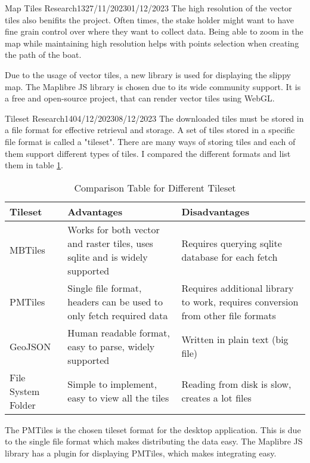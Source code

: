 \documentclass[12pt]{article}
\begin{document}
\begin{logbook-entry}{Map Tiles Research}{13}{27/11/2023}{01/12/2023}
The high resolution of the vector tiles also benifits the project.
Often times, the stake holder might want to have fine grain control over where they want to collect data.
Being able to zoom in the map while maintaining high resolution helps with points selection when creating the path of the boat.

Due to the usage of vector tiles, a new library is used for displaying the slippy map.
The Maplibre JS library is chosen due to its wide community support.
It is a free and open-source project, that can render vector tiles using WebGL.
\end{logbook-entry}

\begin{logbook-entry}{Tileset Research}{14}{04/12/2023}{08/12/2023}
The downloaded tiles must be stored in a file format for effective retrieval and storage.
A set of tiles stored in a specific file format is called a "tileset".
There are many ways of storing tiles and each of them support different types of tiles.
    I compared the different formats and list them in table \ref{tab:tileset-table}.

\begin{table}[H]
    \centering{}
    \caption{Comparison Table for Different Tileset}
    \label{tab:tileset-table}
    \begin{tabularx}{\textwidth}{l X X}
        \hline
        Tileset & Advantages & Disadvantages\\
        \hline
        MBTiles & Works for both vector and raster tiles, uses sqlite and is widely supported & Requires querying sqlite database for each fetch\\
        PMTiles & Single file format, headers can be used to only fetch required data & Requires additional library to work, requires conversion from other file formats\\
        GeoJSON & Human readable format, easy to parse, widely supported & Written in plain text (big file)\\
        File System Folder & Simple to implement, easy to view all the tiles & Reading from disk is slow, creates a lot files\\
        \hline
    \end{tabularx}
\end{table}

The PMTiles is the chosen tileset format for the desktop application.
This is due to the single file format which makes distributing the data easy.
The Maplibre JS library has a plugin for displaying PMTiles, which makes integrating easy.


\end{logbook-entry}
\end{document}
